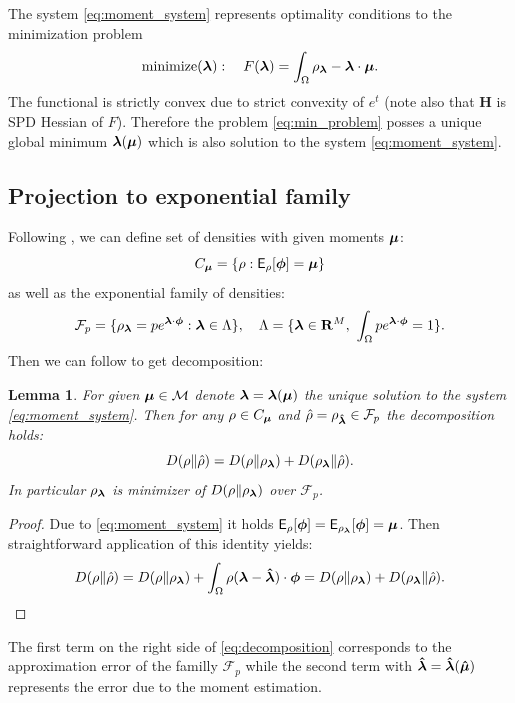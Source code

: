 \documentclass{article}
\newtheorem{lemma}[theorem]{Lemma}
\def\vc#1{\mathbf{\boldsymbol{#1}}}     %
\def\tn#1{\boldsymbol{#1}}
\def \E{{\mathsf E}}
\def\R{\mathbf{R}}
\begin{document}
The system \eqref{eq:moment_system} represents optimality conditions to the minimization problem
\begin{equation}
    \label{eq:min_problem}
    \text{minimize}(\vc\lambda):\quad F(\vl) = \int_{\Omega} \rho_{\vl} - \vl\cdot\vmu.
\end{equation}
The functional is strictly convex due to strict convexity of $e^t$ (note also that $\tn H$ is SPD Hessian of $F$). 
Therefore the problem \eqref{eq:min_problem} posses a unique global minimum $\vl(\vmu)$ which is
also solution to the system \eqref{eq:moment_system}.


\subsection{Projection to exponential family}

Following \cite{Barron1991}, we can define set of densities with given moments $\vmu$:
\[
    C_{\vmu} = \{ \rho : \E_\rho[\vphi] = \vmu \}
\]
as well as the exponential family of densities:
\[
    \mathcal F_{p} = \{ \rho_\vl = 
    p e^{\vl\cdot\vphi} :
    \vl \in \Lambda\},\quad \Lambda = 
    \{\vl\in\R^M,\ \int_\Omega p e^{\vl\cdot\vphi} = 1\}.
\]
Then we can follow \cite[Lemma 2]{Barron1991} to get decomposition:
\begin{lemma}
\label{thm:decomposition}
For given $\vmu \in \mathcal M$ denote $\vl =\vl(\vmu)$ the unique solution to the system \eqref{eq:moment_system}. Then for any $\rho \in C_{\vmu}$ and $\estrho=\rho_\estvl \in\mathcal F_p$ the decomposition holds:
\begin{equation}
    \label{eq:decomposition}
    D(\rho\Vert\estrho) = D(\rho\Vert\rho_{\vl}) + D(\rho_{\vl}\Vert
    \estrho).
\end{equation}
In particular $\rho_{\vl}$ is minimizer of $D(\rho\Vert\rho_{\vl})$ over $\mathcal F_p$.
\end{lemma}
\begin{proof}
Due to \eqref{eq:moment_system} it holds $\E_{\rho}[\vphi] = \E_{\rho_{\vl}}[\vphi] = \vmu$. Then straightforward application of this identity yields:
\[
 D(\rho\Vert\estrho) = D(\rho\Vert\rho_{\vl}) 
 + \int_\Omega \rho (\vl - \estvl)\cdot \vc \phi = D(\rho\Vert\rho_{\vl}) + D(\rho_{\vl}\Vert\estrho).
\]
\end{proof}
The first term  on the right side of \eqref{eq:decomposition} corresponds to the approximation error of the familly $\mathcal F_p$ while the second term with $\estvl = \estvl(\estvmu)$ represents the error due to the moment estimation. 
\end{document}
